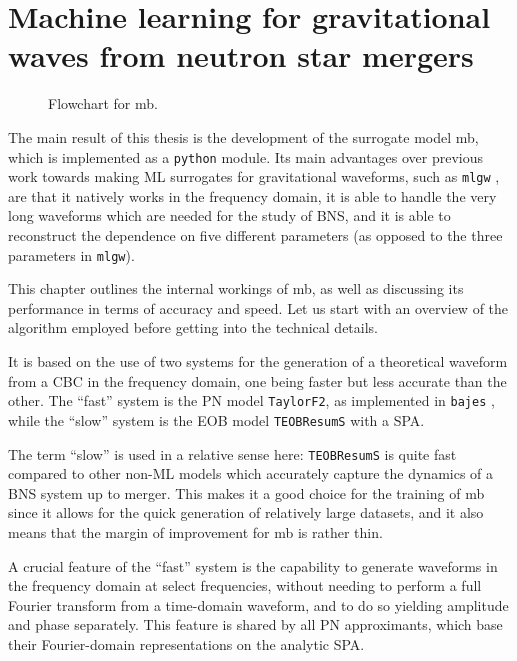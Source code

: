\documentclass[main.tex]{subfiles}
\begin{document}
\chapter{Machine learning for gravitational waves from neutron star mergers} \label{chap:mlgw-bns}

\begin{figure}[ht]
\centering

\caption{Flowchart for \ac{mb}.}
\label{fig:flowchart}
\end{figure}

\newpage

The main result of this thesis is the development of the surrogate model \ac{mb}, which is implemented as a \texttt{python} module. 
Its main advantages over previous work towards making \ac{ML} surrogates for gravitational waveforms, such as \texttt{mlgw} \cite[]{schmidtMachineLearningGravitational2020}, are that it natively works in the frequency domain, it is able to handle the very long waveforms which are needed for the study of \ac{BNS}, and it is able to reconstruct the dependence on five different parameters (as opposed to the three parameters in \texttt{mlgw}).

This chapter outlines the internal workings of \ac{mb}, as well as discussing its performance in terms of accuracy and speed.
Let us start with an overview of the algorithm employed before getting into the technical details. 

It is based on the use of two systems for the generation of a theoretical waveform from a \ac{CBC} in the frequency domain, one being faster but less accurate than the other.
The ``fast'' system is the \ac{PN} model \texttt{TaylorF2}, as implemented in \texttt{bajes} \cite[]{breschiTtBajesBayesian2021}, while the ``slow'' system is the \ac{EOB} model \texttt{TEOBResumS} with a \ac{SPA}. 

The term ``slow'' is used in a relative sense here: \texttt{TEOBResumS} is quite fast compared to other non-\ac{ML} models which accurately capture the dynamics of a \ac{BNS} system up to merger. 
This makes it a good choice for the training of \ac{mb} since it allows for the quick generation of relatively large datasets, and it also means that the margin of improvement for \ac{mb} is rather thin.

A crucial feature of the ``fast'' system is the capability to generate waveforms in the frequency domain at select frequencies, without needing to perform a full Fourier transform from a time-domain waveform, and to do so yielding amplitude and phase separately.
This feature is shared by all \ac{PN} approximants, which base their Fourier-domain representations on the analytic \ac{SPA}.
\end{document}
